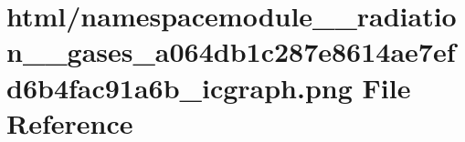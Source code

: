 \hypertarget{namespacemodule____radiation____gases__a064db1c287e8614ae7efd6b4fac91a6b__icgraph_8png}{}\section{html/namespacemodule\+\_\+\+\_\+radiation\+\_\+\+\_\+gases\+\_\+a064db1c287e8614ae7efd6b4fac91a6b\+\_\+icgraph.png File Reference}
\label{namespacemodule____radiation____gases__a064db1c287e8614ae7efd6b4fac91a6b__icgraph_8png}
